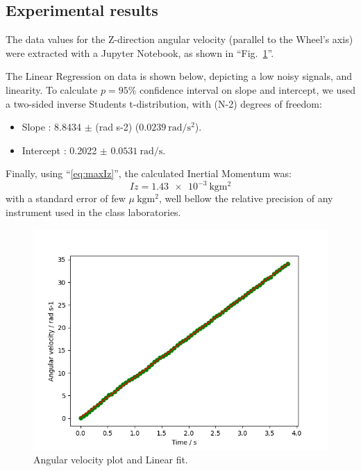 \documentclass[conference]{IEEEtran}
\begin{document}
\subsection{Experimental results}
The data values for the Z-direction angular velocity (parallel to the Wheel's axis) were extracted with a Jupyter Notebook, as shown in ``Fig.~\ref{figAngleVel}''. 

The Linear Regression on data is shown below, depicting a low noisy signals, and linearity.  
To calculate $p=95\%$ confidence interval on slope and intercept, we used a two-sided inverse Students t-distribution, with (N-2) degrees of freedom:

\begin{itemize}
    \item Slope : 8.8434 $\pm$ (rad s-2) ($\SI{0.0239}{\radian\per\second\squared}$).

    \item Intercept : 0.2022 $\pm$ $\SI{0.0531}{\radian\per\second}$.
\end{itemize}

Finally, using ``\eqref{eq:maxIz}'', the calculated Inertial Momentum was:
\begin{equation}
     Iz  = \SI{1.43e-3}{\kg\meter\squared}
\end{equation}
with a standard error of few $\mu\SI{}{\kg\meter\squared}$, well bellow the relative precision of any instrument used in the class laboratories.

  
\begin{figure}[tbp]
\centerline{\includegraphics[width=.95\columnwidth]{AngAccel.png}}
\caption{Angular velocity plot and Linear fit.}
\label{figAngleVel}
\end{figure}
\end{document}
